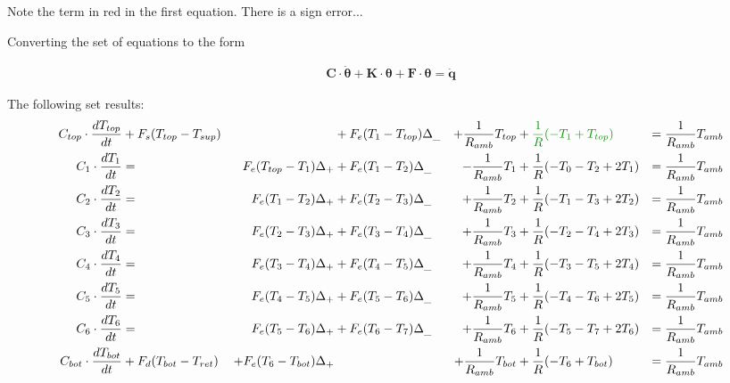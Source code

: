 \begin{scriptsize}
	Note the term in red in the first equation. There is a sign error...
	
	Converting the set of equations to the form
	
	\begin{subequations}
		\label{app:eq:matnot}
		\begin{align}
			\mathbf{C} \cdot \boldsymbol{\dot{\theta}} + \mathbf{K} \cdot \boldsymbol{\theta} + \mathbf{F} \cdot \boldsymbol{\theta}= \mathbf{\dot{q}}
		\end{align}
	\end{subequations}
	
	The following set results:
	\begin{equation}
		\begin{aligned}
			C_{top} \cdot \frac{dT_{top}}{dt} &+F_s (T_{top} - T_{sup}) &&+ F_e (T_1 - T_{top}) \Delta_{\_} &+ \frac{1}{R_{amb}} T_{top} &+ {\color{darkgreen}\frac{1}{R} (-T_1 + T_{top})}  &= \frac{1}{R_{amb}} T_{amb} \\
			C_1 \cdot \frac{dT_1}{dt} &= &F_e (T_{top} - T_1) \Delta_{+} &+ F_e (T_1 - T_2) \Delta_{\_} &- \frac{1}{R_{amb}} T_1 &+ \frac{1}{R} (-T_0 -T_2 + 2 T_1) &= \frac{1}{R_{amb}} T_{amb}\\
			C_2 \cdot \frac{dT_2}{dt} &= &F_e (T_1 - T_2) \Delta_{+} &+ F_e (T_2 - T_3) \Delta_{\_} &+ \frac{1}{R_{amb}} T_2 &+ \frac{1}{R} (-T_1 -T_3 + 2 T_2) &= \frac{1}{R_{amb}} T_{amb}\\
			C_3 \cdot \frac{dT_3}{dt} &= &F_e (T_2 - T_3) \Delta_{+} &+ F_e (T_3 - T_4) \Delta_{\_} &+ \frac{1}{R_{amb}} T_3 &+ \frac{1}{R} (-T_2 - T_4 + 2 T_3) &= \frac{1}{R_{amb}} T_{amb}\\
			C_4 \cdot \frac{dT_4}{dt} &= &F_e (T_3 - T_4) \Delta_{+} &+ F_e (T_4 - T_5) \Delta_{\_} &+ \frac{1}{R_{amb}} T_4 &+ \frac{1}{R} (-T_3 - T_5 + 2 T_4) &= \frac{1}{R_{amb}} T_{amb}\\
			C_5 \cdot \frac{dT_5}{dt} &= &F_e (T_4 - T_5) \Delta_{+} &+ F_e (T_5 - T_6) \Delta_{\_} &+ \frac{1}{R_{amb}} T_5 &+ \frac{1}{R} (-T_4 - T_6 + 2 T_5) &= \frac{1}{R_{amb}} T_{amb}\\
			C_6 \cdot \frac{dT_6}{dt} &= &F_e (T_5 - T_6) \Delta_{+} &+ F_e (T_6 - T_7) \Delta_{\_} &+ \frac{1}{R_{amb}} T_6 &+ \frac{1}{R} (-T_5 - T_7 + 2 T_6) &= \frac{1}{R_{amb}} T_{amb}\\
			C_{bot} \cdot \frac{dT_{bot}}{dt} &+ F_d (T_{bot} - T_{ret}) &+ F_e (T_6 - T_{bot}) \Delta_{+} &&+ \frac{1}{R_{amb}} T_{bot} &+ \frac{1}{R} (-T_6 + T_{bot}) &= \frac{1}{R_{amb}} T_{amb}\\
		\end{aligned}
	\end{equation}
	

\end{scriptsize}
